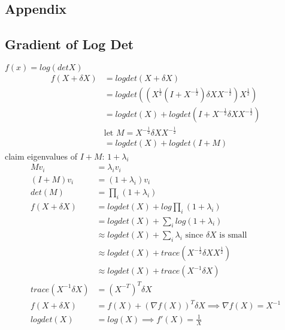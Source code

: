 \message{ !name(notebook.tex)}\documentclass[8pt]{report}
\begin{document}
\begin{multicols*}{2}
  \pagebreak
  
  \section{Appendix}

  \subsection{Gradient of Log Det}
  $f(x)=log(det X)$\\
  \begin{align*}
    f(X+\delta X) &= logdet(X+\delta X)\\
                  &= logdet((X^{\frac{1}{2}}(I+X^{-\frac{1}{2}}) \delta X X^{-\frac{1}{2}})X^{\frac{1}{2}})\\
                  &= logdet(X)+logdet(I+X^{-\frac{1}{2}} \delta X X^{-\frac{1}{2}})\\
                  & \text{let } M = X^{-\frac{1}{2}} \delta X X^{-\frac{1}{2}}\\
                  &= logdet(X)+logdet(I+M)
  \end{align*}
  claim eigenvalues of $I+M$: $1+\lambda_i$
  \begin{align*}
    Mv_i &= \lambda_i v_i\\
    (I+M)v_i &= (1+\lambda_i)v_i\\
    det(M)&=\prod_i(1+\lambda_i)\\
    f(X+\delta X) &= logdet(X) + log \prod_i(1+\lambda_i)\\
         &= logdet(X) + \sum_i log(1+\lambda_i)\\
         &\approx logdet(X) + \sum_i \lambda_i \text{ since } \delta X \text{ is small}\\
         &\approx logdet(X) + trace(X^{-\frac{1}{2}} \delta X X^{\frac{1}{2}})\\
         &\approx logdet(X) + trace(X^{-1} \delta X)\\
    trace(X^{-1} \delta X) &= (X^{-T})^T \delta X\\
    f(X+\delta X) &= f(X) + (\nabla f(X))^T \delta X \implies \nabla f(X) = X^{-1}\\
    logdet(X) &= log(X) \implies f'(X)=\frac{1}{X}
  \end{align*}
    

\end{multicols*}
\end{document}

